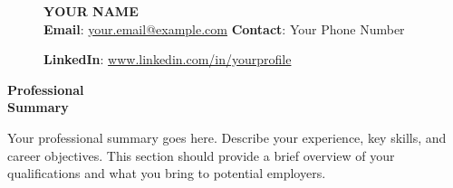 \documentclass[11pt, a4paper]{article}
\begin{document}
\begin{figure}[h!]
    \centering
    \begin{minipage}{0.2\textwidth}
        \centering
    \end{minipage}%
    \begin{minipage}{0.78\textwidth}
        \centering
        {\fontsize{38}{38}\selectfont \textbf{YOUR NAME}}\\
        \textbf{Email}: \href{mailto:your.email@example.com}{your.email@example.com} \hspace{2cm}
\textbf{Contact}: {Your Phone Number}

\textbf{LinkedIn}: \href{https://www.linkedin.com/in/yourprofile}{www.linkedin.com/in/yourprofile}
    \end{minipage}
\end{figure}
\vspace{-15pt}

\begin{center}
\begin{tcolorbox}[
    colback=gray!20,
    colframe=gray!20,
    sharp corners,
    boxrule=0pt,
    width=\textwidth,
    arc=0mm,               %
    boxsep=10pt            %
]
\begin{minipage}{0.22\textwidth}
    \Large \textbf{Professional \\ Summary}
\end{minipage}%
\begin{minipage}{0.76\textwidth}
    Your professional summary goes here. Describe your experience, key skills, and career objectives. This section should provide a brief overview of your qualifications and what you bring to potential employers.
\end{minipage}
\end{tcolorbox}
\end{center}
\end{document}
